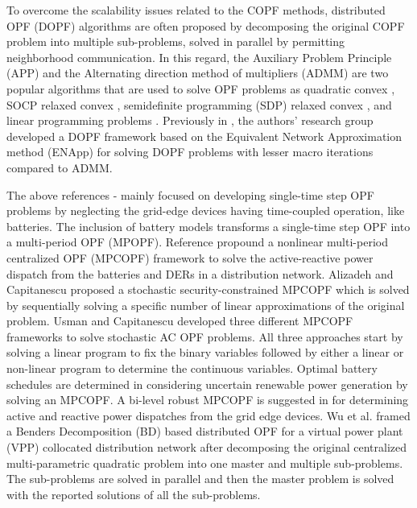 \documentclass{article}
\begin{document}
To overcome the scalability issues related to the COPF methods, distributed OPF (DOPF) algorithms are often proposed by decomposing the original COPF problem into multiple sub-problems, solved in parallel by permitting neighborhood communication. In this regard, the Auxiliary Problem Principle (APP) and the Alternating direction method of multipliers (ADMM) are two popular algorithms that are used to solve OPF problems as quadratic convex \cite{Fazio}, SOCP relaxed convex \cite{Zheng}, semidefinite programming (SDP) relaxed convex \cite{Wang, Biswas}, and linear programming problems \cite{Paul2}. Previously in \cite{Sadnan}, the authors' research group developed a DOPF framework based on the Equivalent Network Approximation method (ENApp) for solving DOPF problems with lesser macro iterations compared to ADMM.



The above references \cite{Wei}-\cite{Paul2} mainly focused on developing single-time step OPF problems by neglecting the grid-edge devices having time-coupled operation, like batteries. The inclusion of battery models transforms a single-time step OPF into a multi-period OPF (MPOPF). Reference \cite{Gabash} propound a nonlinear multi-period centralized OPF (MPCOPF) framework to solve the active-reactive power dispatch from the batteries and DERs in a distribution network. Alizadeh and Capitanescu \cite{Alizadeh} proposed a stochastic security-constrained MPCOPF which is solved by sequentially solving a specific number of linear approximations of the original problem. Usman and Capitanescu \cite{Usman} developed three different MPCOPF frameworks to solve stochastic AC OPF problems. All three approaches start by solving a linear program to fix the binary variables followed by either a linear or non-linear program to determine the continuous variables. Optimal battery schedules are determined in \cite{Aghdam} considering uncertain renewable power generation by solving an MPCOPF.  A bi-level robust MPCOPF is suggested in \cite{Zhang1} for determining active and reactive power dispatches from the grid edge devices. Wu et al. \cite{Wu} framed a Benders Decomposition (BD) based distributed OPF for a virtual power plant (VPP) collocated distribution network after decomposing the original centralized multi-parametric quadratic problem into one master and multiple sub-problems. The sub-problems are solved in parallel and then the master problem is solved with the reported solutions of all the sub-problems. 
\end{document}
